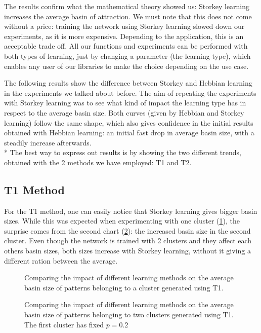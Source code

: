 The results confirm what the mathematical theory showed us: Storkey learning
increases the average basin of attraction. We must note that this does not
come without a price: training the network using Storkey learning slowed down
our experiments, as it is more expensive. Depending to the application, this
is an acceptable trade off. All our functions and experiments can be performed
with both types of learning, just by changing a parameter (the learning type),
which enables any user of our libraries to make the choice depending on the
use case.

The following results show the difference between Storkey and Hebbian learning in the experiments we talked about before.
The aim of repeating the experiments with Storkey learning was to see what kind of impact the learning type has in respect to the average basin size.
Both curves (given by Hebbian and Storkey learning) follow the same shape, which also gives confidence in the initial results obtained with Hebbian learning: an initial fast drop in
average basin size, with a steadily increase afterwards.
\\*
The best way to express out results is by showing the two different trends, obtained with the 2 methods we have employed: T1 and T2.

\subsection{T1 Method}

For the T1 method, one can easily notice that Storkey learning gives bigger basin sizes. While this was expected when experimenting with one cluster
 (\ref{fig:plot-storkey-T1-onecluster}), the surprise comes from the second chart (\ref{fig:plot-storkey-T1-twoclusters}): the  increased basin size in the second cluster. Even though the network is trained with 2 clusters
and they affect each others basin sizes, both sizes increase with Storkey learning, without it giving a different ration between the average.


\begin{figure}[!ht]
  \centering
  
\caption{Comparing the impact of different learning methods on the average basin size of patterns belonging to a cluster generated using T1.}
\label{fig:plot-storkey-T1-onecluster}
\end{figure}

\begin{figure}[!ht]
  \centering
  
\caption{Comparing the impact of different learning methods on the average basin size of patterns belonging to two clusters generated using T1. The first cluster has fixed $p = 0.2$}
\label{fig:plot-storkey-T1-twoclusters}
\end{figure}


